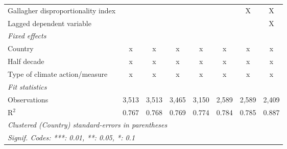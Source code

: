\begin{tabular}{lccccccc}
   Gallagher disproportionality index                              &               &               &              &              &             & X           & X\\  
   Lagged dependent variable                                       &               &               &              &              &             &             & X\\  
   \emph{Fixed effects}\\
   Country                                                         & x             & x             & x            & x            & x           & x           & x\\  
   Half decade                                                     & x             & x             & x            & x            & x           & x           & x\\  
   Type of climate action/measure                                  & x             & x             & x            & x            & x           & x           & x\\  
   \midrule \emph{Fit statistics}\\
   Observations                                                    & 3,513         & 3,513         & 3,465        & 3,150        & 2,589       & 2,589       & 2,409\\  
   R$^2$                                                           & 0.767         & 0.768         & 0.769        & 0.774        & 0.784       & 0.785       & 0.887\\  
   \midrule
   \multicolumn{8}{l}{\emph{Clustered (Country) standard-errors in parentheses}}\\
   \multicolumn{8}{l}{\emph{Signif. Codes: ***: 0.01, **: 0.05, *: 0.1}}\\
\end{tabular}
\par\endgroup


